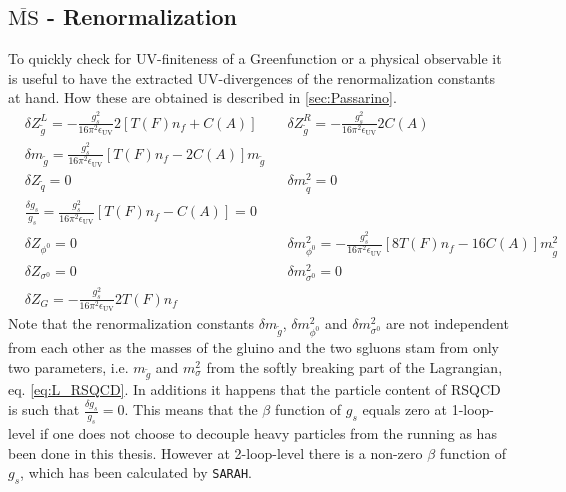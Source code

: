 \subsection{$\overline{\mathrm{MS}}$ - Renormalization}\label{sec:MSRen}
To quickly check for UV-finiteness of a Greenfunction or a physical observable it is useful to have the extracted UV-divergences of the renormalization constants at hand. How these are obtained is described in \ref{sec:Passarino}.
\begin{align}
& \delta Z_{\tilde{g}}^L = -\frac{g_s^2}{16\pi^2\epsilon_{\mathrm{UV}}} 2\left[ T(F) n_f + C(A) \right] &&  \delta Z_{\tilde{g}}^R = -\frac{g_s^2}{16\pi^2\epsilon_{\mathrm{UV}}} 2 C(A)\nonumber\\
& \delta m_{\tilde{g}} = \frac{g_s^2}{16\pi^2\epsilon_{\mathrm{UV}}} \left[ T(F) n_f - 2C(A) \right] m_{\tilde{g}}\nonumber\\
& \delta Z_{\tilde{q}} = 0 && \delta m_{\tilde{q}}^2 = 0\nonumber\\
&\frac{\delta g_s}{g_s} = \frac{g_s^2}{16\pi^2\epsilon_{\mathrm{UV}}}\left[ T(F) n_f - C(A) \right] = 0\nonumber\\
& \delta Z_{\phi^0} = 0 && \delta m_{\phi^0}^2 = -\frac{g_s^2}{16\pi^2\epsilon_{\mathrm{UV}}}\left[ 8T(F)n_f - 16C(A) \right]m_{\tilde{g}}^2\nonumber\\
& \delta Z_{\sigma^0} = 0 && \delta m_{\sigma^0}^2 = 0\nonumber\\
& \delta Z_{G} = -\frac{g_s^2}{16\pi^2\epsilon_{\mathrm{UV}}} 2T(F) n_f
\end{align}
Note that the renormalization constants $\delta m_{\tilde{g}}$, $\delta m^2_{\phi^0}$ and $\delta m^2_{\sigma^0}$ are not independent from each other as the masses of the gluino and the two sgluons stam from only two parameters, i.e. $m_{\tilde{g}}$ and $m_{\sigma}^2$ from the softly breaking part of the Lagrangian, eq. \ref{eq:L_RSQCD}. 
In additions it happens that the particle content of RSQCD is such that $\frac{\delta g_s}{g_s} = 0$. This means that the $\beta$ function of $g_s$ equals zero at 1-loop-level if one does not choose to decouple heavy particles from the running as has been done in this thesis. However at 2-loop-level there is a non-zero $\beta$ function of $g_s$, which has been calculated by \texttt{SARAH}\cite{Staub:2013tta, Staub:2012pb, Staub:2010jh, Staub:2009bi}.



